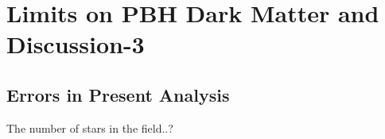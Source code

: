 \documentclass[iop, apj]{emulateapj}
\newcommand{\?}{\stackrel{?}{=}}
\begin{document}
\section{Limits on PBH Dark Matter and Discussion-3}
\subsection{Errors in Present Analysis}
The number of stars in the field..?
\end{document}
